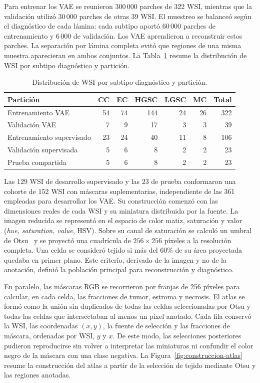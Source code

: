 Para entrenar los VAE se reunieron \(300\,000\) parches de 322 WSI, mientras
que la validación utilizó \(30\,000\) parches de otras 39 WSI. El muestreo se
balanceó según el diagnóstico de cada lámina: cada subtipo aportó
\(60\,000\) parches de entrenamiento y \(6\,000\) de validación. Los VAE
aprendieron a reconstruir estos parches. La separación por lámina completa
evitó que regiones de una misma muestra aparecieran en ambos conjuntos.
La Tabla~\ref{tab:wsi-diagnostico-particion} resume la distribución de WSI
por subtipo diagnóstico y partición.

\begin{table}[htbp]
    \centering
    \caption{Distribución de WSI por subtipo diagnóstico y partición.}
    \label{tab:wsi-diagnostico-particion}
    \small
    \begin{tabularx}{\textwidth}{@{}Xrrrrrr@{}}
        \toprule
        Partición & CC & EC & HGSC & LGSC & MC & Total \\
        \midrule
        Entrenamiento VAE & 54 & 74 & 144 & 24 & 26 & 322 \\
        Validación VAE & 7 & 9 & 17 & 3 & 3 & 39 \\
        Entrenamiento supervisado & 23 & 24 & 40 & 11 & 8 & 106 \\
        Validación supervisada & 5 & 6 & 8 & 2 & 2 & 23 \\
        Prueba compartida & 5 & 6 & 8 & 2 & 2 & 23 \\
        \bottomrule
    \end{tabularx}
\end{table}

Las 129 WSI de desarrollo supervisado y las 23 de prueba conformaron una
cohorte de 152 WSI con máscaras suplementarias, independiente de las 361
empleadas para desarrollar los VAE. Su construcción comenzó con
las dimensiones reales de cada WSI y su miniatura distribuida por la fuente.
La imagen reducida se representó en el espacio de color matiz, saturación y valor
(\emph{hue, saturation, value}, HSV). Sobre su canal de saturación se calculó un umbral de
Otsu~\cite{otsu_threshold_1979} y se proyectó una cuadrícula de
\(256\times256\) píxeles a la resolución
completa. Una celda se consideró tejido si más del 60\% de su área proyectada
quedaba en primer plano. Este criterio, derivado de la imagen y no de la
anotación, definió la población principal para reconstrucción y diagnóstico.

En paralelo, las máscaras RGB se recorrieron por franjas de 256 píxeles para
calcular, en cada celda, las fracciones de tumor, estroma y necrosis. El atlas
se formó como la unión sin duplicados de todas las celdas seleccionadas por
Otsu y todas las celdas que intersectaban al menos un píxel anotado. Cada fila
conservó la WSI, las coordenadas \((x,y)\), la fuente de selección y las
fracciones de máscara, ordenadas por WSI, \(y\) y \(x\). De este modo, las
selecciones posteriores pudieron reproducirse sin volver a interpretar las
miniaturas ni confundir el color negro de la máscara con una clase negativa.
La Figura~\ref{fig:construccion-atlas} resume la construcción del atlas a
partir de la selección de tejido mediante Otsu y las regiones anotadas.

